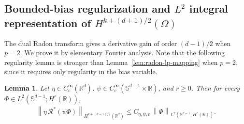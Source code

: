 \documentclass[12pt]{article}
\numberwithin{equation}{section}
\newtheorem{lemma}{Lemma}[section]
\numberwithin{figure}{section}
\numberwithin{equation}{section}
\newcommand{\R}{\mathbb{R}}
\newcommand{\Sph}{\mathbb S}
\newcommand{\norm}[1]{\left\|#1\right\|}
\begin{document}
\subsection{Bounded-bias regularization and
\texorpdfstring{$L^2$}{L2} integral representation of
\texorpdfstring{$H^{k+(d+1)/2}(\Omega)$}{Hk+(d+1)/2(Omega)} }
The dual Radon transform gives a derivative gain of order $(d-1)/2$ when $p=2$.
We prove it by elementary Fourier analysis. Note that the following regularity lemma is stronger
than Lemma~\ref{lem:radon-lp-mapping} when $p=2$, since it requires only regularity in the 
bias variable.

\begin{lemma}
\label{lem:localized-dual-radon}
Let $\eta\in C_c^\infty(\R^d)$, $\psi\in C_c^\infty(\Sph^{d-1}\times\R)$, and
$r\ge0$. Then for every $\Phi\in L^2(\Sph^{d-1};H^r(\R))$,
\begin{align}
    \norm{\eta\,\mathcal R^*(\psi\Phi)}_{H^{r+(d-1)/2}(\R^d)}
    \le C_{\eta,\psi,r}\,\norm{\Phi}_{L^2(\Sph^{d-1};H^r(\R))}.
    \label{eq:localized-dual-radon-estimate}
\end{align}
\end{lemma}
\end{document}
